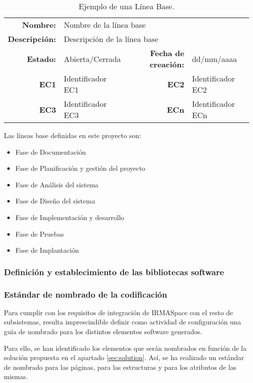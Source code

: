 \begin{table}[h]
\begin{center}
\begin{tabular}{ r l | r l }
\hline
\textbf{Nombre:} & \multicolumn{3}{l}{Nombre de la línea base} \\
\textbf{Descripción:} & \multicolumn{3}{l}{Descripción de la línea base} \\ \hline \hline
\textbf{Estado:} & Abierta/Cerrada & \textbf{Fecha de creación:} & dd/mm/aaaa \\
\textbf{EC1} & Identificador EC1 & \textbf{EC2} & Identificador EC2 \\
\textbf{EC3} & Identificador EC3 & \textbf{ECn} & Identificador ECn \\
\hline
\end{tabular}
\caption{Ejemplo de una Línea Base.}
\label{tab:baseLine}
\end{center}
\end{table}

\par Las líneas base definidas en este proyecto son:
\begin{itemize}[-]
  \item Fase de Documentación
  \item Fase de Planificación y gestión del proyecto
  \item Fase de Análisis del sistema
  \item Fase de Diseño del sistema
  \item Fase de Implementación y desarrollo
  \item Fase de Pruebas
  \item Fase de Implantación
\end{itemize}


\subsubsection{Definición y establecimiento de las bibliotecas software}

\subsubsection{Estándar de nombrado de la codificación}
\par Para cumplir con los requisitos de integración de IRMASpace con el resto de subsistemas, resulta imprescindible definir como actividad de configuración una guía de nombrado para los distintos elementos software generados.
\par Para ello, se han identificado los elementos que serán nombrados en función de la solución propuesta en el apartado \ref{sec:solution}. Así, se ha realizado un estándar de nombrado para las páginas, para las estructuras y para los atributos de las mismas.

